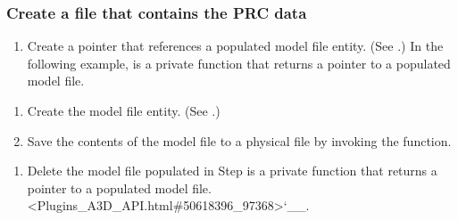 \documentclass[letterpaper,12pt,english,openany,oneside]{sphinxmanual}
\begin{document}
\subsubsection{Create a file that contains the PRC data}
\label{\detokenize{Plugins_A3D_API:create-a-file-that-contains-the-prc-data}}\begin{enumerate}
%
\item {} 
Create a pointer that references a populated model file entity. (See .) In the following example,  is a private function that returns a pointer to a populated model file.

\end{enumerate}

\begin{sphinxVerbatim}[commandchars=\\\{\}]
   
\end{sphinxVerbatim}
\begin{enumerate}
%
\setcounter{enumi}{1}
\item {} 
Create the model file entity. (See .)

\item {} 
Save the contents of the model file to a physical file by invoking the  function.

\end{enumerate}

\begin{sphinxVerbatim}[commandchars=\\\{\}]
    
      
       
\end{sphinxVerbatim}
\begin{enumerate}
%
\setcounter{enumi}{3}
\item {} 
Delete the model file populated in Step  is a private function that returns a pointer to a populated model file. <Plugins\_A3D\_API.html\#50618396\_97368>`\_\_.

\end{enumerate}
\end{document}
